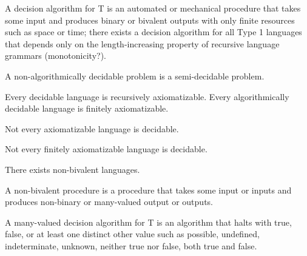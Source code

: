 A decision algorithm for T is an automated or mechanical procedure that
takes some input and produces binary or bivalent outputs with only
finite resources such as space or time; there exists a decision
algorithm for all Type 1 languages that depends only on the
length-increasing property of recursive language grammars
(monotonicity?).

A non-algorithmically decidable problem is a semi-decidable problem.

Every decidable language is recursively axiomatizable. Every
algorithmically decidable language is finitely axiomatizable.

Not every axiomatizable language is decidable.

Not every finitely axiomatizable language is decidable.

There exists non-bivalent languages.

A non-bivalent procedure is a procedure that takes some input or inputs
and produces non-binary or many-valued output or outputs.

A many-valued decision algorithm for T is an algorithm that halts with
true, false, or at least one distinct other value such as possible,
undefined, indeterminate, unknown, neither true nor false, both true and
false.